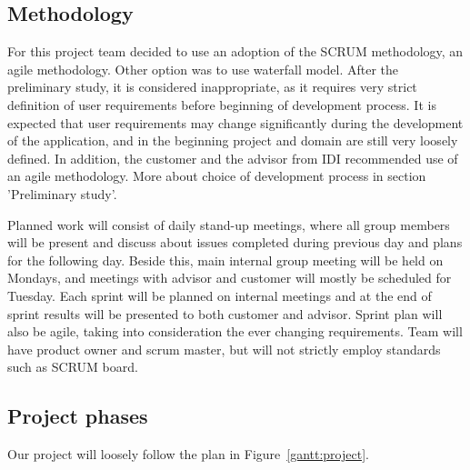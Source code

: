 \subsection{Methodology}

For this project team decided to use an adoption of the SCRUM methodology, an agile methodology. Other option was to use waterfall model. After the preliminary study, it is considered inappropriate, as it requires very strict definition of user requirements before beginning of development process. It is expected that user requirements may change significantly during the development of the application, and in the beginning project and domain are still very loosely defined. In addition, the customer and the advisor from IDI recommended use of an agile methodology. More about choice of development process in section 'Preliminary study'.

Planned work will consist of daily stand-up meetings, where all group members will be present and discuss about issues completed during previous day and plans for the following day. Beside this, main internal group meeting will be held on Mondays, and meetings with advisor and customer will mostly be scheduled for Tuesday. Each sprint will be planned on internal meetings and at the end of sprint results will be presented to both customer and advisor. Sprint plan will also be agile, taking into consideration the ever changing requirements. Team will have product owner and scrum master, but will not strictly employ standards such as SCRUM board. 

\subsection{Project phases}

Our project will loosely follow the plan in Figure~\ref{gantt:project}.

